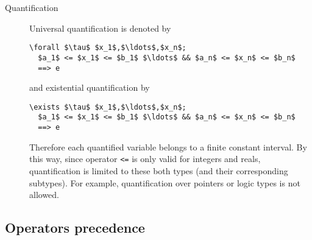 \begin{description}
\item[Quantification] Universal quantification is denoted by
\begin{lstlisting}
\forall $\tau$ $x_1$,$\ldots$,$x_n$;
  $a_1$ <= $x_1$ <= $b_1$ $\ldots$ && $a_n$ <= $x_n$ <= $b_n$
  ==> e
\end{lstlisting} and existential quantification by
\begin{lstlisting}
\exists $\tau$ $x_1$,$\ldots$,$x_n$;
  $a_1$ <= $x_1$ <= $b_1$ $\ldots$ && $a_n$ <= $x_n$ <= $b_n$
  ==> e
\end{lstlisting}
Therefore each quantified variable belongs to a finite constant interval. By
this way, since operator \lstinline|<=| is only valid for integers and reals,
quantification is limited to these both types (and their corresponding
subtypes). For example, quantification over \C pointers or logic types is not
allowed.
\end{description}


\subsection{Operators precedence}
\nodiff

